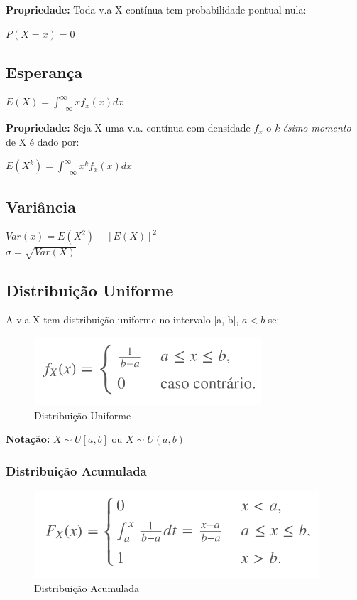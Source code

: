 \documentclass[a4paper, 12pt]{article}
\begin{document}
	\textbf{Propriedade:} Toda v.a X contínua tem probabilidade pontual nula:
	\begin{center}
		\Large
		$
		P(X = x) = 0
		$
	\end{center}
	
\subsection{Esperança}
	\begin{center}
		\Large
		$
		E(X) = \int_{-\infty}^{\infty}x f_{x}(x)dx
		$
	\end{center}
	\textbf{Propriedade:} Seja X uma v.a. contínua com densidade $f_{x}$ o \textit{k-ésimo momento} de X é dado por:
	\begin{center}
		\Large
		$
		E(X^{k})=\int_{-\infty}^{\infty}x^{k}f_{x}(x)dx
		$
	\end{center}

\subsection{Variância}
	\begin{center}
		\Large
		$
		Var(x) = E(X^{2}) - [E(X)]^{2}
		$\\
		$
		\sigma = \sqrt{Var(X)}
		$
	\end{center}
	
\subsection{Distribuição Uniforme}
	A v.a X tem distribuição uniforme no intervalo [a, b], $a < b$ se:
	\begin{figure}[h]
		\centering
		\includegraphics[width=0.5\linewidth]{imagens/eq}
		\caption{Distribuição Uniforme}
		\label{fig:eq}
	\end{figure}
	
	\textbf{Notação:} $X \sim U[a,b]$ ou $X \sim U(a,b)$
	
\subsubsection{Distribuição Acumulada}
	\begin{figure}[h]
		\centering
		\includegraphics[width=0.5\linewidth]{imagens/eq2}
		\caption{Distribuição Acumulada}
		\label{fig:eq2}
	\end{figure}
\end{document}
